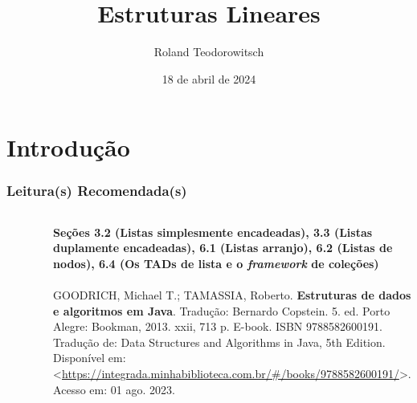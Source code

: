 \documentclass[aspectratio=169]{beamer}
\title[\sc{Estruturas Lineares}]{Estruturas Lineares}
\author[Roland Teodorowitsch]{Roland Teodorowitsch}
\institute[ALEST I - EP - PUCRS]{Algoritmos e Estruturas de Dados I - Escola Politécnica - PUCRS}
\date{18 de abril de 2024}
\begin{document}
\justifying

\begin{frame}
	\titlepage
\end{frame}

\section{Introdução}

\begin{frame}\frametitle{Leitura(s) Recomendada(s)}

\begin{columns}[T]
\begin{column}{0.15\linewidth}
\vspace{-3mm}
\begin{figure}[h]
	\centering
	\includegraphics[height=0.3\paperheight]{imagens/livro_goodrich.jpg}
\end{figure}
\end{column}
\begin{column}{0.85\linewidth}
\tiny{\textbf{Seções 3.2 (Listas simplesmente encadeadas), 3.3 (Listas duplamente encadeadas), 6.1 (Listas arranjo), 6.2 (Listas de nodos), 6.4 (Os TADs de lista e o \emph{framework} de coleções)}\\
~}\\
\scriptsize{GOODRICH, Michael T.; TAMASSIA, Roberto. \textbf{Estruturas de dados e algoritmos em Java}. Tradução: Bernardo Copstein. 5. ed. Porto Alegre: Bookman, 2013. xxii, 713 p. E-book. ISBN 9788582600191. Tradução de: Data Structures and Algorithms in Java, 5th Edition. Disponível em: \textless{}\url{https://integrada.minhabiblioteca.com.br/\#/books/9788582600191/}\textgreater{}. Acesso em: 01 ago. 2023.}
\end{column}
\end{columns}

\end{frame}
\end{document}

